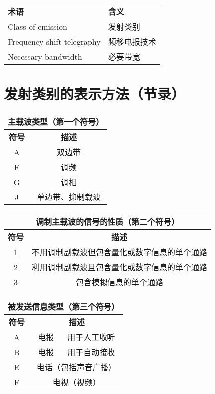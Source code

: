 \begin{longtable}[l]{ll}
  \textbf{术语}                & \textbf{含义} \\
  Class of emission          & 发射类别        \\
  Frequency-shift telegraphy & 频移电报技术      \\
  Necessary bandwidth        & 必要带宽        \\
\end{longtable}

\newpage

\section{发射类别的表示方法（节录）}

\begin{tabular}{|c|c|}
  \hline
  \multicolumn{2}{|c|}{\textbf{主载波类型（第一个符号）}} \\
  \hline
  \textbf{符号} & \textbf{描述}                   \\
  \hline
  A           & 双边带                           \\
  \hline
  F           & 调频                            \\
  \hline
  G           & 调相                            \\
  \hline
  J           & 单边带、抑制载波                      \\
  \hline
\end{tabular}

\bigskip

\begin{tabular}{|c|c|}
  \hline
  \multicolumn{2}{|c|}{\textbf{调制主载波的信号的性质（第二个符号）}} \\
  \hline
  \textbf{符号} & \textbf{描述}                         \\
  \hline
  1           & 不用调制副载波但包含量化或数字信息的单个通路              \\
  \hline
  2           & 利用调制副载波且包含量化或数字信息的单个通路              \\
  \hline
  3           & 包含模拟信息的单个通路                         \\
  \hline
\end{tabular}

\bigskip

\begin{tabular}{|c|c|}
  \hline
  \multicolumn{2}{|c|}{\textbf{被发送信息类型（第三个符号）}} \\
  \hline
  \textbf{符号} & \textbf{描述}                     \\
  \hline
  A           & 电报⸺用于人工收听                      \\
  \hline
  B           & 电报⸺用于自动接收                      \\
  \hline
  E           & 电话（包括声音广播）                      \\
  \hline
  F           & 电视（视频）                          \\
  \hline
\end{tabular}

